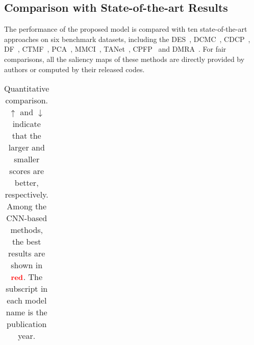 \documentclass[runningheads]{llncs}
\newcommand{\textBC}[2]{\textbf{\textcolor{#1}{#2}}}
\begin{document}
\subsection{Comparison with State-of-the-art Results}
The performance of the proposed model is compared
with ten state-of-the-art approaches on six benchmark datasets, including the DES~\cite{RGBD135}, DCMC~\cite{DCMC}, CDCP~\cite{CDCP}, DF~\cite{DF}, CTMF~\cite{CTMF}, PCA~\cite{PCA}, MMCI~\cite{MMCI}, TANet~\cite{TANet}, CPFP~\cite{CPFP} and DMRA~\cite{DMRA}. For fair comparisons, all the saliency maps of these methods are directly provided by authors or computed by their released codes.
\begin{table*}[ht]
\large
  \caption{
  Quantitative comparison. $\uparrow$ and $ \downarrow$ indicate that the larger and smaller scores are better, respectively. Among the CNN-based methods, the best results are shown in $\textBC{red}{red}$. The subscript in each model name is the publication year.
  }
  \label{tab:scores}
   \renewcommand\tabcolsep{5.0pt} \renewcommand\arraystretch{1.5}
  \centering

\resizebox{0.92\textwidth}{!}  
{
\begin{tabular}{ll|lll|lllllll|ll}

   \toprule[2pt]
 

\end{tabular}}
\end{table*}
\end{document}
